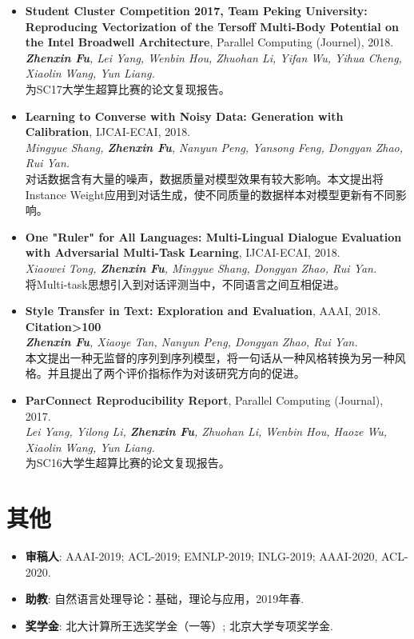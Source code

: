 \documentclass[letterpaper]{article}
\def\footerlink{https://zhenxinfu.com/zhenxinfu.pdf}
\begin{document}
\begin{itemize}
\item \textbf{Student Cluster Competition 2017, Team Peking University: Reproducing Vectorization of the Tersoff Multi-Body Potential on the Intel Broadwell Architecture}, Parallel Computing (Journel), 2018. \\
{\it \textbf{Zhenxin Fu}, Lei Yang, Wenbin Hou, Zhuohan Li, Yifan Wu, Yihua Cheng, Xiaolin Wang, Yun Liang.} \\
为SC17大学生超算比赛的论文复现报告。

\item \textbf{Learning to Converse with Noisy Data: Generation with Calibration}, IJCAI-ECAI, 2018. \\
  {\it Mingyue Shang, \textbf{Zhenxin Fu}, Nanyun Peng, Yansong Feng, Dongyan Zhao, Rui Yan.}  \\
  对话数据含有大量的噪声，数据质量对模型效果有较大影响。本文提出将Instance Weight应用到对话生成，使不同质量的数据样本对模型更新有不同影响。

\item \textbf{One "Ruler" for All Languages: Multi-Lingual Dialogue Evaluation with Adversarial Multi-Task Learning}, IJCAI-ECAI, 2018. \\
  {\it Xiaowei Tong, \textbf{Zhenxin Fu}, Mingyue Shang, Dongyan Zhao, Rui Yan.}  \\
  将Multi-task思想引入到对话评测当中，不同语言之间互相促进。

\item \textbf{Style Transfer in Text: Exploration and Evaluation}, AAAI, 2018. \textbf{Citation>100}\\
  {\it \textbf{Zhenxin Fu}, Xiaoye Tan, Nanyun Peng, Dongyan Zhao, Rui Yan.} \\
  本文提出一种无监督的序列到序列模型，将一句话从一种风格转换为另一种风格。并且提出了两个评价指标作为对该研究方向的促进。
  
\item \textbf{ParConnect Reproducibility Report}, Parallel Computing (Journal), 2017.\\
  {\it Lei Yang, Yilong Li, \textbf{Zhenxin Fu}, Zhuohan Li, Wenbin Hou, Haoze Wu, Xiaolin Wang, Yun Liang.} \\
  为SC16大学生超算比赛的论文复现报告。
\end{itemize}


\section*{其他}
\begin{itemize}
  \item \textbf{审稿人}: AAAI-2019; ACL-2019; EMNLP-2019; INLG-2019; AAAI-2020, ACL-2020.
  \item \textbf{助教}: 自然语言处理导论：基础，理论与应用，2019年春.
  \item \textbf{奖学金}: 北大计算所王选奖学金（一等）; 北京大学专项奖学金.
\end{itemize}




\end{document}
